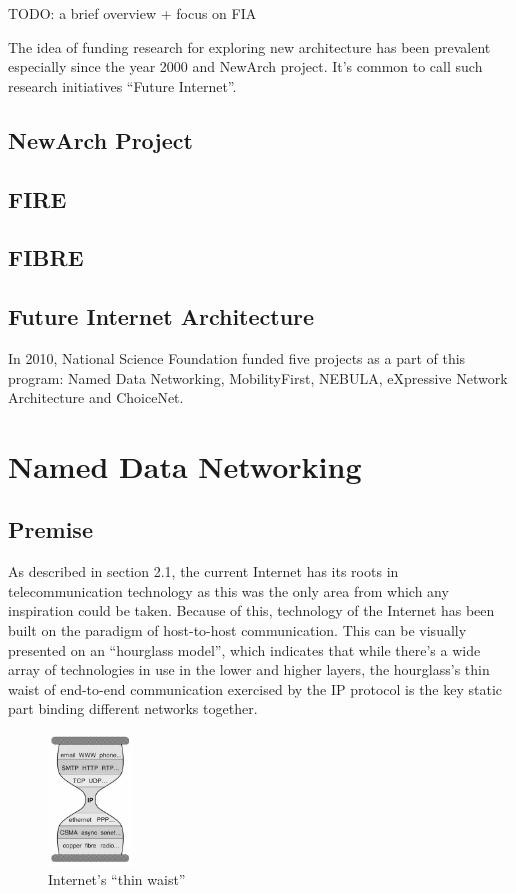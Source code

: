         TODO: a brief overview + focus on FIA

        The idea of funding research for exploring new architecture has been prevalent especially since the year 2000 and NewArch project. It's common to call such research initiatives ``Future Internet''.

        \subsection{NewArch Project}
        \subsection{FIRE}
        \subsection{FIBRE}
        \subsection{Future Internet Architecture}
            In 2010, National Science Foundation funded five projects as a part of this program: Named Data Networking, MobilityFirst, NEBULA, eXpressive Network Architecture and ChoiceNet.


    \section{Named Data Networking}
        \subsection{Premise}
            As described in section 2.1, the current Internet has its roots in telecommunication technology as this was the only area from which any inspiration could be taken. Because of this, technology of the Internet has been built on the paradigm of host-to-host communication. This can be visually presented on an ``hourglass model'', which indicates that while there's a wide array of technologies in use in the lower and higher layers, the hourglass's thin waist of end-to-end communication exercised by the IP protocol is the key static part binding different networks together.

            \begin{figure}[H]
                \begin{center}
                    \includegraphics[width=0.2\textwidth]{fig/ndn_hourglass1.jpg}
                  \caption{Internet's ``thin waist''}
                  \label{ndn-hourglass1}
                \end{center}
            \end{figure}


